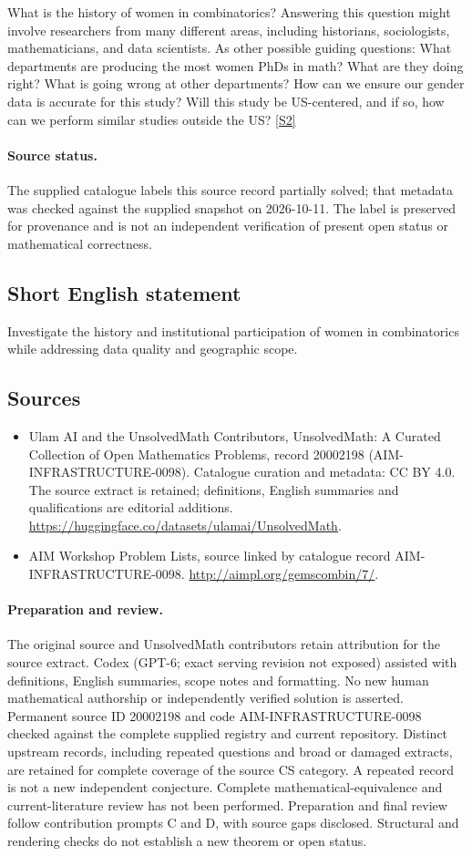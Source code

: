 \documentclass[11pt]{article}
\newcommand{\sref}[2]{\hyperlink{source:#1:#2}{[S#2]}}
\begin{document}
What is the history of women in combinatorics? Answering this question might involve researchers from many different areas, including historians, sociologists, mathematicians, and data scientists. As other possible guiding questions: What departments are producing the most women PhDs in math? What are they doing right? What is going wrong at other departments? How can we ensure our gender data is accurate for this study? Will this study be US-centered, and if so, how can we perform similar studies outside the US? \sref{20002198}{2}
\paragraph{Source status.}
The supplied catalogue labels this source record partially solved; that metadata was checked against the supplied snapshot on 2026-10-11. The label is preserved for provenance and is not an independent verification of present open status or mathematical correctness.
\subsection{Short English statement}
Investigate the history and institutional participation of women in combinatorics while addressing data quality and geographic scope.
\subsection{Sources}
\begin{itemize}
\item[\hypertarget{source:20002198:1}{S1}] Ulam AI and the UnsolvedMath Contributors, UnsolvedMath: A Curated Collection of Open Mathematics Problems, record 20002198 (AIM-INFRASTRUCTURE-0098). Catalogue curation and metadata: CC BY 4.0. The source extract is retained; definitions, English summaries and qualifications are editorial additions.
\url{https://huggingface.co/datasets/ulamai/UnsolvedMath}.
\item[\hypertarget{source:20002198:2}{S2}] AIM Workshop Problem Lists, source linked by catalogue record AIM-INFRASTRUCTURE-0098.
\url{http://aimpl.org/gemscombin/7/}.
\end{itemize}
\paragraph{Preparation and review.}
The original source and UnsolvedMath contributors retain attribution for the source extract. Codex (GPT-6; exact serving revision not exposed) assisted with definitions, English summaries, scope notes and formatting. No new human mathematical authorship or independently verified solution is asserted. Permanent source ID 20002198 and code AIM-INFRASTRUCTURE-0098 checked against the complete supplied registry and current repository. Distinct upstream records, including repeated questions and broad or damaged extracts, are retained for complete coverage of the source CS category. A repeated record is not a new independent conjecture. Complete mathematical-equivalence and current-literature review has not been performed. Preparation and final review follow contribution prompts C and D, with source gaps disclosed. Structural and rendering checks do not establish a new theorem or open status.
\label{end:20002198}
\end{document}

